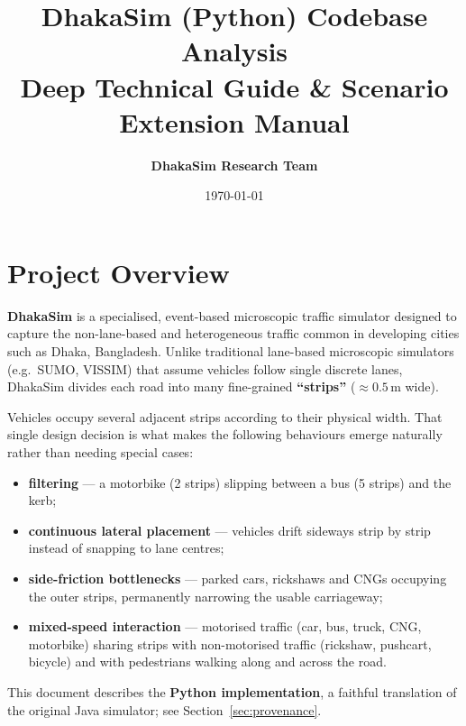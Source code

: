 \documentclass[11pt, a4paper]{article}
\title{\textbf{\huge DhakaSim (Python) Codebase Analysis \\
       \Large Deep Technical Guide \& Scenario Extension Manual}}
\author{\textbf{DhakaSim Research Team}}
\date{\today}
\begin{document}
\maketitle
\tableofcontents
\newpage

\section{Project Overview}

\textbf{DhakaSim} is a specialised, event-based microscopic traffic simulator
designed to capture the non-lane-based and heterogeneous traffic common in
developing cities such as Dhaka, Bangladesh. Unlike traditional lane-based
microscopic simulators (e.g.\ SUMO, VISSIM) that assume vehicles follow single
discrete lanes, DhakaSim divides each road into many fine-grained
\textbf{``strips''} ($\approx 0.5$\,m wide).

Vehicles occupy several adjacent strips according to their physical width. That
single design decision is what makes the following behaviours emerge naturally
rather than needing special cases:

\begin{itemize}
    \item \textbf{filtering} --- a motorbike (2 strips) slipping between a bus
          (5 strips) and the kerb;
    \item \textbf{continuous lateral placement} --- vehicles drift sideways strip
          by strip instead of snapping to lane centres;
    \item \textbf{side-friction bottlenecks} --- parked cars, rickshaws and CNGs
          occupying the outer strips, permanently narrowing the usable
          carriageway;
    \item \textbf{mixed-speed interaction} --- motorised traffic (car, bus,
          truck, CNG, motorbike) sharing strips with non-motorised traffic
          (rickshaw, pushcart, bicycle) and with pedestrians walking along and
          across the road.
\end{itemize}

This document describes the \textbf{Python implementation}, a faithful
translation of the original Java simulator; see
Section~\ref{sec:provenance}.
\end{document}
